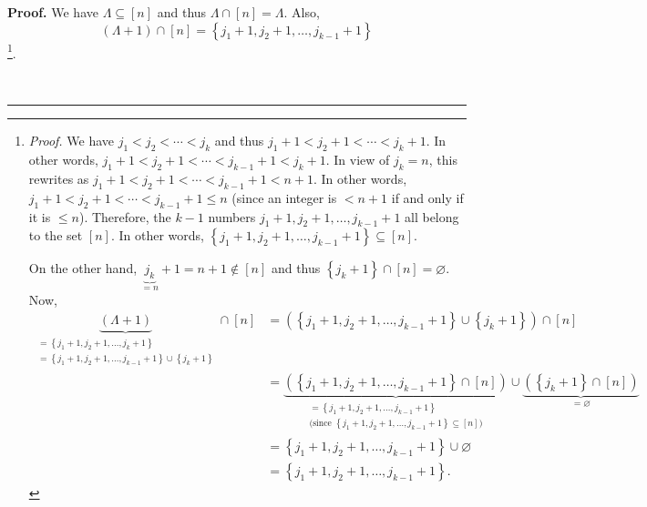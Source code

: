 \documentclass[numbers=enddot,12pt,final,onecolumn,notitlepage]{scrartcl}%
\theoremstyle{definition}
\newenvironment{proof}[1][Proof]{\noindent\textbf{#1.} }{\ \rule{0.5em}{0.5em}}
\newenvironment{verlong}{}{}
\begin{document}
\begin{verlong}
\begin{proof}
We have $\Lambda\subseteq\left[  n\right]  $ and thus $\Lambda\cap\left[
n\right]  =\Lambda$. Also,
\begin{equation}
\left(  \Lambda+1\right)  \cap\left[  n\right]  =\left\{  j_{1}+1,j_{2}%
+1,\ldots,j_{k-1}+1\right\}  \label{pf.lem.FE.exist.c2.1}%
\end{equation}
\footnote{\textit{Proof.} We have $j_{1}<j_{2}<\cdots<j_{k}$ and thus
$j_{1}+1<j_{2}+1<\cdots<j_{k}+1$. In other words, $j_{1}+1<j_{2}%
+1<\cdots<j_{k-1}+1<j_{k}+1$. In view of $j_{k}=n$, this rewrites as
$j_{1}+1<j_{2}+1<\cdots<j_{k-1}+1<n+1$. In other words, $j_{1}+1<j_{2}%
+1<\cdots<j_{k-1}+1\leq n$ (since an integer is $<n+1$ if and only if it is
$\leq n$). Therefore, the $k-1$ numbers $j_{1}+1,j_{2}+1,\ldots,j_{k-1}+1$ all
belong to the set $\left[  n\right]  $. In other words, $\left\{
j_{1}+1,j_{2}+1,\ldots,j_{k-1}+1\right\}  \subseteq\left[  n\right]  $.
\par
On the other hand, $\underbrace{j_{k}}_{=n}+1=n+1\notin\left[  n\right]  $ and
thus $\left\{  j_{k}+1\right\}  \cap\left[  n\right]  =\varnothing$. Now,%
\begin{align*}
\underbrace{\left(  \Lambda+1\right)  }_{\substack{=\left\{  j_{1}%
+1,j_{2}+1,\ldots,j_{k}+1\right\}  \\=\left\{  j_{1}+1,j_{2}+1,\ldots
,j_{k-1}+1\right\}  \cup\left\{  j_{k}+1\right\}  }}\cap\left[  n\right]   &
=\left(  \left\{  j_{1}+1,j_{2}+1,\ldots,j_{k-1}+1\right\}  \cup\left\{
j_{k}+1\right\}  \right)  \cap\left[  n\right] \\
&  =\underbrace{\left(  \left\{  j_{1}+1,j_{2}+1,\ldots,j_{k-1}+1\right\}
\cap\left[  n\right]  \right)  }_{\substack{=\left\{  j_{1}+1,j_{2}%
+1,\ldots,j_{k-1}+1\right\}  \\\text{(since }\left\{  j_{1}+1,j_{2}%
+1,\ldots,j_{k-1}+1\right\}  \subseteq\left[  n\right]  \text{)}}%
}\cup\underbrace{\left(  \left\{  j_{k}+1\right\}  \cap\left[  n\right]
\right)  }_{=\varnothing}\\
&  =\left\{  j_{1}+1,j_{2}+1,\ldots,j_{k-1}+1\right\}  \cup\varnothing\\
&  =\left\{  j_{1}+1,j_{2}+1,\ldots,j_{k-1}+1\right\}  .
\end{align*}
}.


\end{proof}
\end{verlong}
\end{document}
